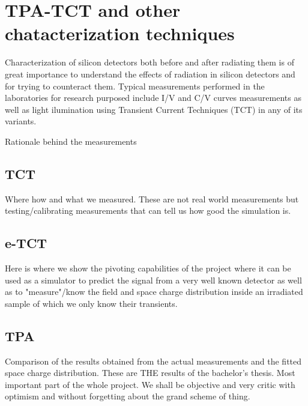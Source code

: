 \chapter{TPA-TCT and other chatacterization techniques}

Characterization of silicon detectors both before and after radiating them is of great importance to understand the effects of radiation in silicon detectors and for trying to counteract them. Typical measurements performed in the laboratories for research purposed include I/V and C/V curves measurements as well as light ilumination using Transient Current Techniques (TCT) in any of its variants. 

Rationale behind the measurements

\section{TCT} %
\label{sec:experimental_method}

Where how and what we measured. These are not real world measurements but testing/calibrating measurements that can tell us how good the simulation is. 


\section{e-TCT} %
\label{sec:fitting_method}

Here is where we show the pivoting capabilities of the project where it can be used as a simulator to predict the signal from a very well known detector as well as to "measure"/know the field and space charge distribution inside an irradiated sample of which we only know their transients.


\section{TPA} %
\label{sec:results_and_comparison_with_tracs_rad}

Comparison of the results obtained from the actual measurements and the fitted space charge distribution. These are THE results of the bachelor's thesis. Most important part of the whole  project. We shall be objective and very critic with optimism and without forgetting about the grand scheme of thing.

